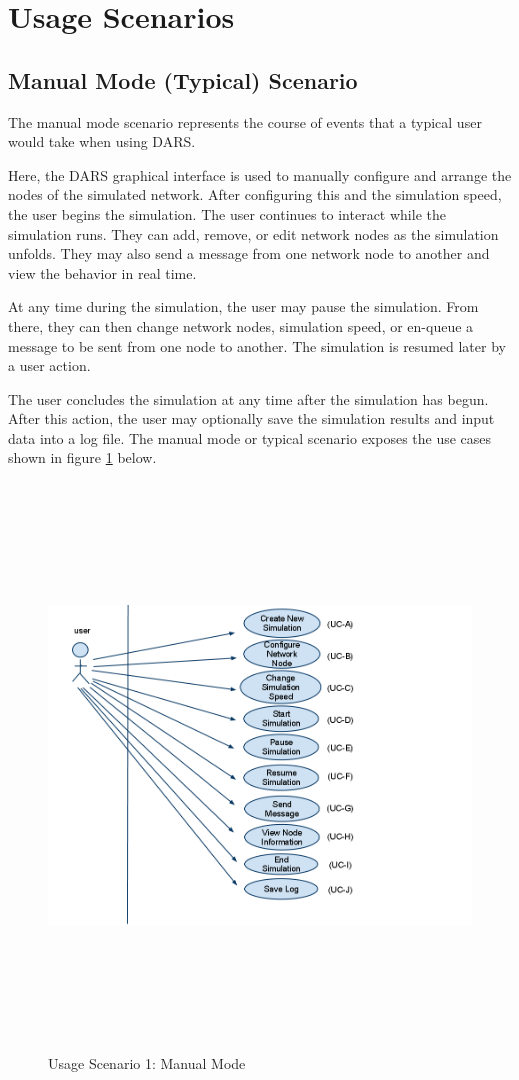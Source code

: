 \documentclass[a4paper,11pt,titlepage]{article}
\begin{document}
\section{Usage Scenarios}

\subsection{Manual Mode (Typical) Scenario}
The manual mode scenario represents the course of events that a typical user would take when using DARS. 
 
Here, the DARS graphical interface is used to manually configure and arrange the nodes of the simulated network. After configuring this and the simulation speed, the user begins the simulation. The user continues to interact while the simulation runs. They can add, remove, or edit network nodes as the simulation unfolds. They may also send a message from one network node to another and view the behavior in real time.
 
At any time during the simulation, the user may pause the simulation. From there, they can then change network nodes, simulation speed, or en-queue a message to be sent from one node to another. The simulation is resumed later by a user action.
 
The user concludes the simulation at any time after the simulation has begun. After this action, the user may optionally save the simulation results and input data into a log file. 
The manual mode or typical scenario exposes the use cases shown in figure \ref{fig:scen1} below.

\begin{figure}[H]
        \centering
	\includegraphics[height=150mm]{img/scenario1.png}
        \caption{Usage Scenario 1: Manual Mode}
        \label{fig:scen1}
\end{figure}
\end{document}
